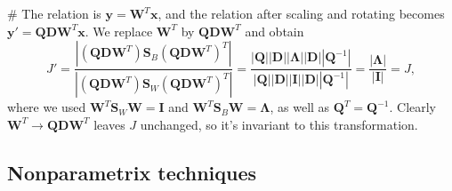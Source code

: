 \documentclass[12pt, a4paper]{article}
\newcommand{\vect}[1]{\bm{#1}}
\newcommand{\abs}[1]{\left\lvert#1\right\rvert}
\begin{document}
\begin{easylist}[enumerate]
# The relation is $\vect{y} = \vect{W}^T \vect{x}$, and the relation after scaling and rotating becomes $\vect{y}' = \vect{Q} \vect{D} \vect{W}^T \vect{x}$.
We replace $\vect{W}^T$ by $\vect{Q} \vect{D} \vect{W}^T$ and obtain
\begin{equation*}
	J' =  
	\frac{\abs{\left( \vect{Q} \vect{D} \vect{W}^T \right) \vect{S}_B \left( \vect{Q} \vect{D} \vect{W}^T \right)^T}}{\abs{\left( \vect{Q} \vect{D} \vect{W}^T \right) \vect{S}_W \left( \vect{Q} \vect{D} \vect{W}^T \right)^T}}
	= 
	\frac{\abs{\vect{Q}} \abs{\vect{D}} \abs{\vect{\Lambda}} \abs{\vect{D}} \abs{\vect{Q}^{-1}}}
	{\abs{\vect{Q}} \abs{\vect{D}} \abs{\vect{I}} \abs{\vect{D}} \abs{\vect{Q}^{-1}}} =
	\frac{\abs{\vect{\Lambda}}}{\abs{\vect{I}}} = J,
\end{equation*}
where we used $\vect{W}^T \vect{S}_W \vect{W} = \vect{I}$ and $\vect{W}^T \vect{S}_B \vect{W} = \vect{\Lambda}$, as well as $\vect{Q}^T = \vect{Q}^{-1}$.
Clearly $\vect{W}^T \to \vect{Q} \vect{D} \vect{W}^T$ leaves $J$ unchanged, so it's invariant to this transformation.
\end{easylist}

\clearpage
\subsection{Nonparametrix techniques}
\end{document}
